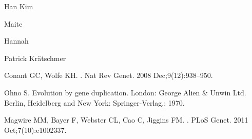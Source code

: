 \documentclass[10pt,letterpaper]{article}\usepackage[]{graphicx}\usepackage[]{color}
\begin{document}
Han Kim

Maite

Hannah 

Patrick Kr{\"a}tschmer



\nolinenumbers

%
%
% 


\begin{thebibliography}{10}

Conant GC, Wolfe KH.
.
\newblock Nat Rev Genet. 2008 Dec;9(12):938--950.

Ohno S.
\newblock Evolution by gene duplication.
\newblock London: George Alien \& Unwin Ltd. Berlin, Heidelberg and New York:
  Springer-Verlag.; 1970.

Magwire MM, Bayer F, Webster CL, Cao C, Jiggins FM.
.
\newblock PLoS Genet. 2011 Oct;7(10):e1002337.

\end{thebibliography}
\end{document}
